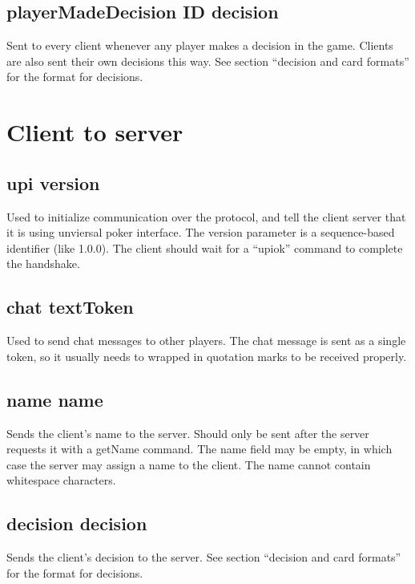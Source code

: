 \documentclass{article}
\begin{document}
\subsection*{playerMadeDecision \textlangle{}ID\textrangle{} \textlangle{}decision\textrangle{}}
Sent to every client whenever any player makes a decision in the game. Clients are also sent their own decisions this way. See section ``decision and card formats'' for the format for decisions.

\section{Client to server}

\subsection*{upi \textlangle{}version\textrangle{}}
Used to initialize communication over the protocol, and tell the client server that it is using unviersal poker interface. The version parameter is a sequence-based identifier (like 1.0.0). The client should wait for a ``upiok'' command to complete the handshake.

\subsection*{chat textToken}
Used to send chat messages to other players. The chat message is sent as a single token, so it usually needs to wrapped in quotation marks to be received properly.

\subsection*{name \textlangle{}name\textrangle{}}
Sends the client's name to the server. Should only be sent after the server requests it with a getName command. The name field may be empty, in which case the server may assign a name to the client. The name cannot contain whitespace characters.

\subsection*{decision \textlangle{}decision\textrangle{}}
Sends the client's decision to the server. See section ``decision and card formats'' for the format for decisions.
\end{document}
